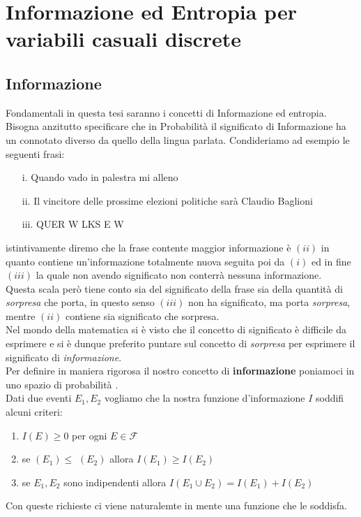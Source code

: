 \chapter{Informazione ed Entropia per variabili casuali discrete}
\label{cha:intro}




\section{Informazione}
\label{sec:informazione}
Fondamentali in questa tesi saranno i concetti di Informazione ed entropia.\\
Bisogna anzitutto specificare che in Probabilità il significato di Informazione ha un connotato diverso da quello della lingua parlata. Condideriamo ad esempio le seguenti frasi: 
\begin{enumerate}
\item[i.] Quando vado in palestra mi alleno
\item[ii.] Il vincitore delle prossime elezioni politiche sarà Claudio Baglioni
\item[iii.] QUER W LKS E W
\end{enumerate}

istintivamente diremo che la frase contente maggior informazione è $(ii)$ in quanto contiene un'informazione totalmente nuova seguita poi da $(i)$ ed in fine $(iii)$ la quale non avendo significato non conterrà nessuna informazione.\\ Questa scala però tiene conto sia del significato della frase sia della quantità di \textit{sorpresa} che porta, in questo senso $(iii)$ non ha significato, ma porta \textit{sorpresa}, mentre $(ii)$ contiene sia significato che sorpresa.\\ Nel mondo della matematica si è visto che il concetto di significato è difficile da esprimere e si è dunque preferito puntare sul concetto di \textit{sorpresa} per esprimere il significato di \textit{informazione}.\\
Per definire in maniera rigorosa il nostro concetto di \textbf{informazione} poniamoci in uno spazio di probabilità \spacep.\\
Dati due eventi $E_1,E_2$ vogliamo che la nostra funzione d'informazione $I$ soddifi alcuni criteri:

\begin{enumerate} 
\item $I(E)\geq 0$ per ogni $E\in \mathcal{F}$
\item se \p$(E_1)\leq $ \p$(E_2)$ allora $I(E_1)\geq I(E_2)$ 
\item se $E_1,E_2$ sono indipendenti allora $I(E_1\cup E_2)=I(E_1)+ I(E_2)$
\end{enumerate} 
Con queste richieste ci viene naturalemte in mente una funzione che le soddisfa.

